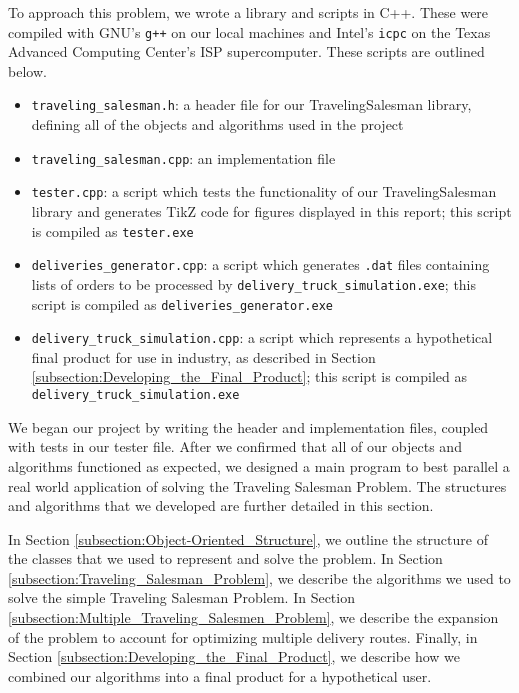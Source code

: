 \documentclass[letterpaper]{article}
\begin{document}
    To approach this problem, we wrote a library and scripts in C++. These were compiled with GNU's \verb|g++| on our local machines and Intel's \verb|icpc| on the Texas Advanced Computing Center's ISP supercomputer. These scripts are outlined below.
    \begin{itemize}
        \item \verb|traveling_salesman.h|: a header file for our TravelingSalesman library, defining all of the objects and algorithms used in the project
        \item \verb|traveling_salesman.cpp|: an implementation file
        \item \verb|tester.cpp|: a script which tests the functionality of our TravelingSalesman library and generates TikZ code for figures displayed in this report; this script is compiled as \verb|tester.exe|
        \item \verb|deliveries_generator.cpp|: a script which generates \verb|.dat| files containing lists of orders to be processed by \verb|delivery_truck_simulation.exe|; this script is compiled as \verb|deliveries_generator.exe|
        \item \verb|delivery_truck_simulation.cpp|: a script which represents a hypothetical final product for use in industry, as described in Section \ref{subsection:Developing_the_Final_Product}; this script is compiled as \verb|delivery_truck_simulation.exe|
    \end{itemize}

    We began our project by writing the header and implementation files, coupled with tests in our tester file. After we confirmed that all of our objects and algorithms functioned as expected, we designed a main program to best parallel a real world application of solving the Traveling Salesman Problem. The structures and algorithms that we developed are further detailed in this section.

    In Section \ref{subsection:Object-Oriented_Structure}, we outline the structure of the classes that we used to represent and solve the problem. In Section \ref{subsection:Traveling_Salesman_Problem}, we describe the algorithms we used to solve the simple Traveling Salesman Problem. In Section \ref{subsection:Multiple_Traveling_Salesmen_Problem}, we describe the expansion of the problem to account for optimizing multiple delivery routes. Finally, in Section \ref{subsection:Developing_the_Final_Product}, we describe how we combined our algorithms into a final product for a hypothetical user.
\end{document}
